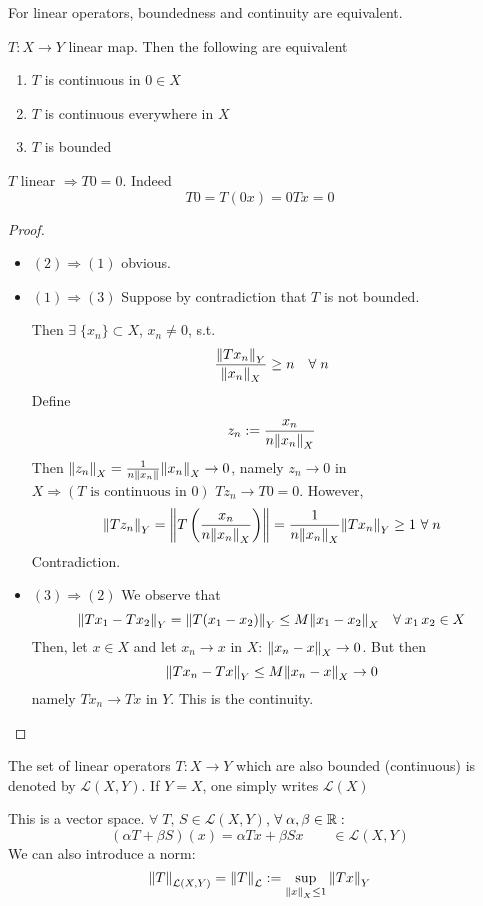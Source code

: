 For linear operators, boundedness and continuity are equivalent.
\begin{theorem}
    \(T:X \to Y\) linear map. Then the following are equivalent
    \begin{enumerate}
        \item \(T\) is continuous in \(0 \in X\)
        \item \(T\) is continuous everywhere in \(X\)
        \item \(T\) is bounded
    \end{enumerate}
\end{theorem}
\begin{remark}
    \(T\) linear \(\Rightarrow T0 = 0\). Indeed
    \[
        T0 = T(0x) =  0 Tx = 0
    \]
\end{remark}
\begin{proof}
    
    \begin{itemize}
        \item \((2) \Rightarrow (1)\) obvious.
        \item \((1) \Rightarrow (3)\) Suppose by contradiction that \(T\) is not bounded. 
        
        Then \(\exists \; \{ x_n \} \subset X \), \(x_n \neq 0\), s.t. 
        \[
            \frac{\norm{T x_n}_Y}{\norm{x_n}_X} \geq n \quad \forall\; n
        \]
        Define
        \[
            z_n := \frac{x_n}{n \norm{x_n}_X}
        \]
        Then \(\norm{z_n }_X = \frac{1}{n \norm{x_n}} \norm{x_n}_X \to 0\),
        namely \(z_n \to 0 \) in \( X \Rightarrow (T \text{ is continuous in }0)\) \(T z_n \to T0 =0\).
        However, 
        \[
            \norm{T z_n}_Y = \norm{T\left(\frac{x_n}{n \norm{x_n}_X}\right)} = \frac{1}{n \norm{x_n}_X} \norm{T x_n}_Y \geq 1 \ \forall\; n
        \]
        Contradiction.
        \item \((3) \Rightarrow (2)\) 
        We observe that 
        \[
            \norm{Tx_1 - Tx_2}_Y = \norm{T(x_1 - x_2)}_Y \leq M \norm{x_1 - x_2}_X  \quad \forall \; x_1 \, x_2 \in X
        \]
        Then, let \(x \in X \) and let \(x_n \to x\) in \(X\): \(\norm{x_n - x}_X \to 0\). But then
        \[
            \norm{T x_n - Tx}_Y \leq M \norm{x_n - x}_X \to 0
        \]
        namely \(Tx_n \to Tx \) in \(Y\). This is the continuity.
    \end{itemize}
\end{proof}

\begin{definition}
    The set of linear operators \(T : X \to Y\) which are also bounded (continuous) is denoted by \(\mathcal{L}(X, Y)\).    If \(Y=X\), one simply writes \(\mathcal{L}(X)\)
\end{definition}
This is a vector space. \( \forall\; T,\, S \in \mathcal{L}(X, Y) \), \(\forall\; \alpha, \beta \in \mathbb{R}:\)
\[
     (\alpha T + \beta S)(x) = \alpha Tx + \beta Sx \qquad \in \mathcal{L}(X, Y)
\]
We can also introduce a norm:
\[
    \norm{T}_{\mathcal{L}(X, Y)} = \norm{T}_\mathcal{L} := \sup_{\norm{x}_X \leq 1} \norm{Tx}_Y
\]

